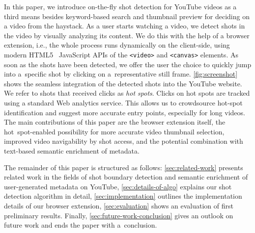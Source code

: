 \documentclass{acm_proc_article-sp}
\begin{document}
In this paper, we introduce on-the-fly shot detection for YouTube videos as a third means besides keyword-based search and thumbnail preview for deciding on a video from the haystack. As a user starts watching a video, we detect shots in the video by visually analyzing its content. We do this with the help of a browser extension, i.e., the whole process runs dynamically on the client-side, using modern HTML5~\cite{w3c_html5} JavaScript APIs of the \texttt{<video>} and \texttt{<canvas>} elements. As soon as the shots have been detected, we offer the user the choice to quickly jump into a~specific shot by clicking on a~representative still frame. \autoref{fig:screenshot} shows the seamless integration of the detected shots into the YouTube website. We refer to shots that received clicks as \emph{hot spots}. Clicks on hot spots are tracked using a standard Web analytics service. This allows us to crowdsource hot-spot identification and suggest more accurate entry points, especially for long videos. The main contributions of this paper are the browser extension itself, the hot~spot-enabled possibility for more accurate video thumbnail selection, improved video navigability by shot access, and the potential combination with text-based semantic enrichment of metadata.

The remainder of this paper is structured as follows: \autoref{sec:related-work} presents related work in the fields of shot boundary detection and semantic enrichment of user-generated metadata on YouTube, \autoref{sec:details-of-algo} explains our shot detection algorithm in detail, \autoref{sec:implementation} outlines the implementation details of our browser extension, \autoref{sec:evaluation} shows an evaluation of first preliminary results. Finally, \autoref{sec:future-work-conclusion} gives an outlook on future work and ends the paper with a~\mbox{conclusion}.
\end{document}
